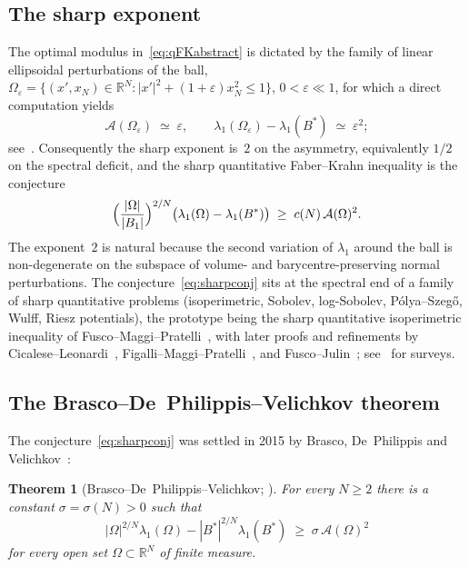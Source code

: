 \documentclass[11pt]{article}
\newtheorem{theorem}{Theorem}[section]
\theoremstyle{definition}
\newcommand{\R}{\mathbb{R}}
\newcommand{\Fr}{\mathcal{A}}
\newcommand{\Om}{\Omega}
\newcommand{\eps}{\varepsilon}
\begin{document}
\subsection{The sharp exponent}\label{ssec:sharpexp}

The optimal modulus in~\eqref{eq:qFKabstract} is dictated by the
family of linear ellipsoidal perturbations of the ball,
$\Om_\eps=\{(x',x_N)\in\R^N:|x'|^2+(1+\eps)x_N^2\le1\}$,
$0<\eps\ll1$, for which a direct computation yields
\[
   \Fr(\Om_\eps)\;\simeq\;\eps,\qquad
   \lambda_1(\Om_\eps)-\lambda_1(B^*)\;\simeq\;\eps^2;
\]
see~\cite[\S1.2]{BDV}. Consequently the sharp exponent is~$2$ on the
asymmetry, equivalently $1/2$ on the spectral deficit, and the sharp
quantitative Faber--Krahn inequality is the conjecture
\begin{equation}\label{eq:sharpconj}
   \Bigl(\frac{|\Om|}{|B_1|}\Bigr)^{2/N}
   \bigl(\lambda_1(\Om)-\lambda_1(B^*)\bigr)
   \;\ge\;c(N)\,\Fr(\Om)^2.
\end{equation}
The exponent~$2$ is natural because the second variation of $\lambda_1$
around the ball is non-degenerate on the subspace of volume- and
barycentre-preserving normal perturbations.
The conjecture~\eqref{eq:sharpconj} sits at the spectral end of a
family of sharp quantitative problems (isoperimetric, Sobolev,
log-Sobolev, P\'olya--Szeg\H o, Wulff, Riesz potentials), the
prototype being the sharp quantitative isoperimetric inequality of
Fusco--Maggi--Pratelli~\cite{FMP}, with later proofs and refinements
by Cicalese--Leonardi~\cite{CL2012},
Figalli--Maggi--Pratelli~\cite{FigalliMaggiPratelli}, and
Fusco--Julin~\cite{FuscoJulin}; see~\cite{FuscoSurvey,Maggi2008} for
surveys.

\subsection{The Brasco--De~Philippis--Velichkov theorem}\label{ssec:BDV}

The conjecture~\eqref{eq:sharpconj} was settled in 2015 by Brasco,
De~Philippis and Velichkov~\cite{BDV}:

\begin{theorem}[Brasco--De~Philippis--Velichkov; {\cite[Main Theorem]{BDV}}]
\label{thm:BDV}
For every $N\ge2$ there is a constant $\sigma=\sigma(N)>0$ such that
\[
   |\Om|^{2/N}\lambda_1(\Om)-|B^*|^{2/N}\lambda_1(B^*)
   \;\ge\;\sigma\,\Fr(\Om)^2
\]
for every open set $\Om\subset\R^N$ of finite measure.
\end{theorem}
\end{document}
